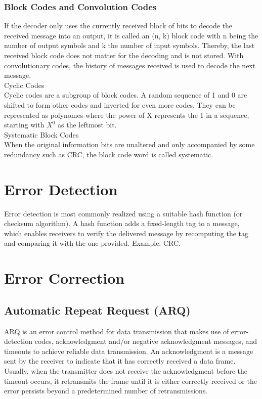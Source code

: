 \subsubsection{Block Codes and Convolution Codes}
If the decoder only uses the currently received block of bits to decode the received message into an output, it is called an (n, k) block code with n being the number of output symbols and k the number of input symbols. Thereby, the last received block code does not matter for the decoding and is not stored. With convolutionary codes, the history of messages received is used to decode the next message.\\
Cyclic Codes\\
Cyclic codes are a subgroup of block codes. A random sequence of 1 and 0 are shifted to form other codes and inverted for even more codes. They can be represented as polynomes where the power of X represents the 1 in a sequence, starting with $X^0$ as the leftmost bit.\\
Systematic Block Codes\\
When the original information bits are unaltered and only accompanied by some redundancy such as CRC, the block code word is called systematic. 
%
\section{Error Detection}%
Error detection is most commonly realized using a suitable hash function (or checksum algorithm). A hash function adds a fixed-length tag to a message, which enables receivers to verify the delivered message by recomputing the tag and comparing it with the one provided. Example: CRC.
%
%
%
%
\section{Error Correction}
%
%
\subsection{Automatic Repeat Request (ARQ)}
ARQ is an error control method for data transmission that makes use of error-detection codes, acknowledgment and/or negative acknowledgment messages, and timeouts to achieve reliable data transmission. An acknowledgment is a message sent by the receiver to indicate that it has correctly received a data frame. Usually, when the transmitter does not receive the acknowledgment before the timeout occurs, it retransmits the frame until it is either correctly received or the error persists beyond a predetermined number of retransmissions.
%
%
